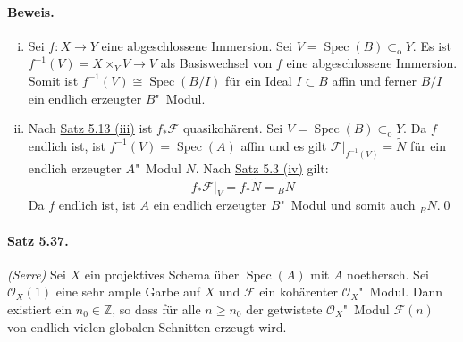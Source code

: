 \paragraph{Beweis.}\begin{enumerate}[(i)]
\item Sei $f:X\to Y$ eine abgeschlossene Immersion. Sei $V=\operatorname{Spec}(B)\subset_\text{o}Y$. Es ist $f^{-1}(V)=X\times_YV\to V$ als Basiswechsel von $f$ eine abgeschlossene Immersion. Somit ist $f^{-1}(V)\cong\operatorname{Spec}(B/I)$ für ein Ideal $I\subset B$ affin und ferner $B/I$ ein endlich erzeugter $B$"~Modul.
\item Nach \hyperref[5.13]{Satz 5.13 (iii)} ist $f_\ast\mathcal{F}$ quasikohärent. Sei $V=\operatorname{Spec}(B)\subset_\text{o}Y$. Da $f$ endlich ist, ist $f^{-1}(V)=\operatorname{Spec}(A)$ affin und es gilt $\mathcal{F}|_{f^{-1}(V)}=\widetilde{N}$ für ein endlich erzeugter $A$"~Modul $N$. Nach \hyperref[5.3]{Satz 5.3 (iv)} gilt:
\[f_\ast\mathcal{F}|_V = f_\ast\widetilde{N} = \widetilde{_BN} \]
Da $f$ endlich ist, ist $A$ ein endlich erzeugter $B$"~Modul und somit auch $_BN$.\qed
\end{enumerate}

\paragraph{Satz 5.37.}\label{5.37} \textit{(Serre)} Sei $X$ ein projektives Schema über $\operatorname{Spec}(A)$ mit $A$ noethersch. Sei $\mathcal{O}_X(1)$ eine sehr ample Garbe auf $X$ und $\mathcal{F}$ ein kohärenter $\mathcal{O}_X$"~Modul. Dann existiert ein $n_0\in\mathbb{Z}$, so dass für alle $n\geq n_0$ der getwistete $\mathcal{O}_X$"~Modul $\mathcal{F}(n)$ von endlich vielen globalen Schnitten erzeugt wird.

